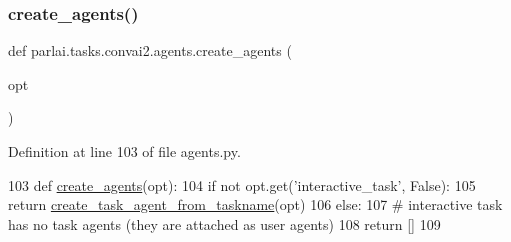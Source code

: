 \subsubsection{\texorpdfstring{create\+\_\+agents()}{create\_agents()}}
{\footnotesize\ttfamily def parlai.\+tasks.\+convai2.\+agents.\+create\+\_\+agents (\begin{DoxyParamCaption}\item[{}]{opt }\end{DoxyParamCaption})}



Definition at line 103 of file agents.\+py.


\begin{DoxyCode}
103 \textcolor{keyword}{def }\hyperlink{namespaceparlai_1_1tasks_1_1wizard__of__wikipedia_1_1agents_a3fb02e79313f0dbce37b5120cc9add1c}{create\_agents}(opt):
104     \textcolor{keywordflow}{if} \textcolor{keywordflow}{not} opt.get(\textcolor{stringliteral}{'interactive\_task'}, \textcolor{keyword}{False}):
105         \textcolor{keywordflow}{return} \hyperlink{namespaceparlai_1_1core_1_1agents_a76269fb567532a8fb7f29edcc20a6e47}{create\_task\_agent\_from\_taskname}(opt)
106     \textcolor{keywordflow}{else}:
107         \textcolor{comment}{# interactive task has no task agents (they are attached as user agents)}
108         \textcolor{keywordflow}{return} []
109 \end{DoxyCode}
